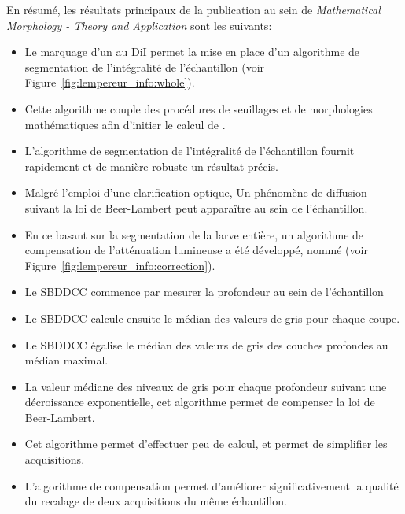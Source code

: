 \documentclass[\main/main.tex]{subfiles}
\begin{document}
En résumé, les résultats principaux de la publication au sein de
\emph{Mathematical Morphology - Theory and Application} sont les suivants:
\begin{itemize}
    \item 
    Le marquage d'un \pz{} au DiI permet la mise en place
    d'un algorithme de segmentation de l'intégralité de l'échantillon (voir Figure~\ref{fig:lempereur_info:whole}).
    
    \item
    Cette algorithme couple des procédures de seuillages et de morphologies mathématiques 
    afin d'initier le calcul de \watersheds.
    
    \item
    L'algorithme de segmentation de l'intégralité de l'échantillon fournit
    rapidement et de manière robuste un résultat précis.
    
    \item
    Malgré l'emploi d'une clarification optique,
    Un phénomène de diffusion suivant la loi de Beer-Lambert peut apparaître au sein de l'échantillon.
    
    \item
    En ce basant sur la segmentation de la larve entière,
    un algorithme de compensation de l'atténuation lumineuse a été développé, nommé \sbddcc 
    (voir Figure~\ref{fig:lempereur_info:correction}).
    
    \item
    Le SBDDCC commence par mesurer la profondeur au sein de l'échantillon
    
    \item
    Le SBDDCC calcule ensuite le médian des valeurs de gris pour chaque coupe.
    
    \item
    Le SBDDCC égalise le médian des valeurs de gris des couches profondes au médian maximal.
    
    \item
    La valeur médiane des niveaux de gris pour chaque profondeur suivant une décroissance exponentielle,
    cet algorithme permet de compenser la loi de Beer-Lambert.
    
    \item
    Cet algorithme permet d'effectuer peu de calcul, et permet de simplifier les acquisitions.
    
    \item
    L'algorithme de compensation permet d'améliorer significativement 
    la qualité du recalage de deux acquisitions du même échantillon.
    

\end{itemize}
\end{document}
